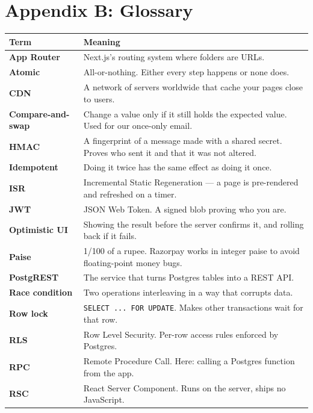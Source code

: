 \documentclass[11pt,a4paper]{article}
\begin{document}
\section{Appendix B: Glossary}
\label{sec:glossary}

\begin{longtable}{@{}p{4.0cm}p{10.8cm}@{}}
\toprule
\textbf{Term} & \textbf{Meaning} \\
\midrule
\endhead
\textbf{App Router} & Next.js's routing system where folders are URLs. \\
\textbf{Atomic} & All-or-nothing. Either every step happens or none does. \\
\textbf{CDN} & A network of servers worldwide that cache your pages close to users. \\
\textbf{Compare-and-swap} & Change a value only if it still holds the expected
value. Used for our once-only email. \\
\textbf{HMAC} & A fingerprint of a message made with a shared secret. Proves who
sent it and that it was not altered. \\
\textbf{Idempotent} & Doing it twice has the same effect as doing it once. \\
\textbf{ISR} & Incremental Static Regeneration --- a page is pre-rendered and
refreshed on a timer. \\
\textbf{JWT} & JSON Web Token. A signed blob proving who you are. \\
\textbf{Optimistic UI} & Showing the result before the server confirms it, and
rolling back if it fails. \\
\textbf{Paise} & 1/100 of a rupee. Razorpay works in integer paise to avoid
floating-point money bugs. \\
\textbf{PostgREST} & The service that turns Postgres tables into a REST API. \\
\textbf{Race condition} & Two operations interleaving in a way that corrupts data. \\
\textbf{Row lock} & \texttt{SELECT ... FOR UPDATE}. Makes other transactions wait
for that row. \\
\textbf{RLS} & Row Level Security. Per-row access rules enforced by Postgres. \\
\textbf{RPC} & Remote Procedure Call. Here: calling a Postgres function from the
app. \\
\textbf{RSC} & React Server Component. Runs on the server, ships no JavaScript. \\

\end{longtable}
\end{document}
